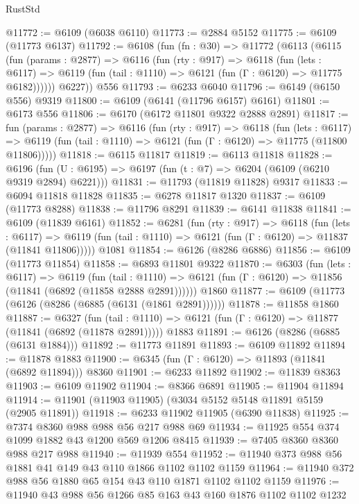 \begin{lexlean}{RustStd}
\begin{coremodule}
@11772 := @6109 (@6038 @6110)
@11773 := @2884 @5152
@11775 := @6109 (@11773 @6137)
@11792 := @6108
    (fun (fn : @30) =>
    @11772
      (@6113
        (@6115
          (fun (params : @2877) =>
          @6116
            (fun (rty : @917) =>
            @6118
              (fun (lets : @6117) =>
              @6119 (fun (tail : @1110) => @6121 (fun (Γ : @6120) => @11775 @6182))))))
        @6227))
    @556
@11793 := @6233 @6040
@11796 := @6149 (@6150 @556) @9319
@11800 := @6109 (@6141 (@11796 @6157) @6161)
@11801 := @6173 @556
@11806 := @6170 (@6172 @11801 @9322 @2888 @2891)
@11817 := fun (params : @2877) =>
  @6116
    (fun (rty : @917) =>
    @6118
      (fun (lets : @6117) =>
      @6119 (fun (tail : @1110) => @6121 (fun (Γ : @6120) => @11775 (@11800 @11806)))))
@11818 := @6115 @11817
@11819 := @6113 @11818
@11828 := @6196 (fun (U : @6195) => @6197 (fun (t : @7) => @6204 (@6109 (@6210 @9319 @2894) @6221)))
@11831 := @11793 (@11819 @11828) @9317
@11833 := @6094 @11818 @11828
@11835 := @6278 @11817 @1320
@11837 := @6109 (@11773 @8288)
@11838 := @11796 @8291
@11839 := @6141 @11838
@11841 := @6109 (@11839 @6161)
@11852 := @6281
    (fun (rty : @917) =>
    @6118
      (fun (lets : @6117) =>
      @6119 (fun (tail : @1110) => @6121 (fun (Γ : @6120) => @11837 (@11841 @11806)))))
    @1081
@11854 := @6126 (@8286 @6886)
@11856 := @6109 (@11773 @11854)
@11858 := @6893 @11801 @9322
@11870 := @6303
    (fun (lets : @6117) =>
    @6119
      (fun (tail : @1110) =>
      @6121 (fun (Γ : @6120) => @11856 (@11841 (@6892 (@11858 @2888 @2891))))))
    @1860
@11877 := @6109 (@11773 (@6126 (@8286 (@6885 (@6131 (@1861 @2891))))))
@11878 := @11858 @1860
@11887 := @6327
    (fun (tail : @1110) => @6121 (fun (Γ : @6120) => @11877 (@11841 (@6892 (@11878 @2891)))))
    @1883
@11891 := @6126 (@8286 (@6885 (@6131 @1884)))
@11892 := @11773 @11891
@11893 := @6109 @11892
@11894 := @11878 @1883
@11900 := @6345 (fun (Γ : @6120) => @11893 (@11841 (@6892 @11894))) @8360
@11901 := @6233 @11892
@11902 := @11839 @8363
@11903 := @6109 @11902
@11904 := @8366 @6891
@11905 := @11904 @11894
@11914 := @11901 (@11903 @11905) (@3034 @5152 @5148 @11891 @5159 (@2905 @11891))
@11918 := @6233 @11902 @11905 (@6390 @11838)
@11925 := @7374 @8360 @988 @988 @56 @217 @988 @69
@11934 := @11925 @554 @374 @1099 @1882 @43 @1200 @569 @1206 @8415
@11939 := @7405 @8360 @8360 @988 @217 @988
@11940 := @11939 @554
@11952 := @11940 @373 @988 @56 @1881 @41 @149 @43 @110 @1866 @1102 @1102 @1159
@11964 := @11940 @372 @988 @56 @1880 @65 @154 @43 @110 @1871 @1102 @1102 @1159
@11976 := @11940 @43 @988 @56 @1266 @85 @163 @43 @160 @1876 @1102 @1102 @1232

\end{coremodule}
\end{lexlean}
